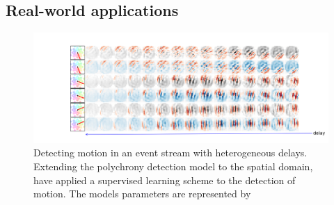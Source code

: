 \documentclass[brainsci, %
               review,submit,pdftex,moreauthors
               ]{Definitions/mdpi}
\begin{document}







\subsection{Real-world applications}
\begin{figure}%
  \centering
  \includegraphics[width=0.980\linewidth]{figures/2022-11-10_MotionDetection_kernel.png}
    \caption{Detecting motion in an event stream with heterogeneous delays. Extending the polychrony detection model to the spatial domain,~\citet{grimaldi_learning_2022} have applied a supervised learning scheme to the detection of motion. The models parameters are represented by 
     }
  \label{fig:icip}
\end{figure}
% 
\end{document}
